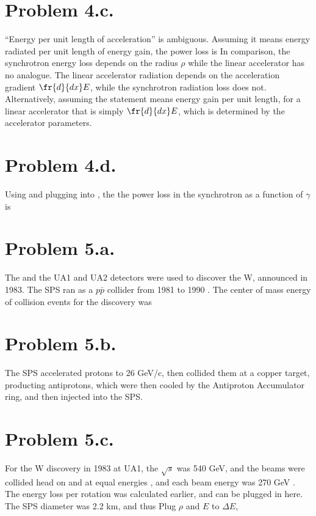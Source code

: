 \documentclass{article}
\begin{document}
\section*{Problem 4.c.}
``Energy per unit length of acceleration'' is ambiguous. Assuming it means energy radiated per unit length of energy gain, the power loss is
In comparison, the synchrotron energy loss depends on the radius $\rho$ while the linear accelerator has no analogue. The linear accelerator radiation depends on the acceleration gradient $\fr{d}{dx}E$, while the synchrotron radiation loss does not. Alternatively, assuming the statement means energy gain per unit length, for a linear accelerator that is simply $\fr{d}{dx}E$, which is determined by the accelerator parameters.
\section*{Problem 4.d.}
Using
and plugging into , the the power loss in the synchrotron as a function of $\gamma$ is
\section*{Problem 5.a.}
The  and the UA1 and UA2 detectors were used to discover the W, announced in 1983. The SPS ran as a $p\bar{p}$ collider from 1981 to 1990 \cite{a}. The center of mass energy of collision events for the discovery was
\section*{Problem 5.b.}
The SPS accelerated protons to 26 GeV/c, then collided them at a copper target, producting antiprotons, which were then cooled by the Antiproton Accumulator ring, and then injected into the SPS.
\section*{Problem 5.c.}
For the W discovery in 1983 at UA1, the $\sqrt{s}$ was 540 GeV, and the beams were collided head on and at equal energies \cite{a}, and each beam energy was 270 GeV \cite{b}. The energy loss per rotation was calculated earlier, and can be plugged in here. The SPS diameter was 2.2 km, and thus
Plug $\rho$ and $E$ to $\Delta E$,
\end{document}
